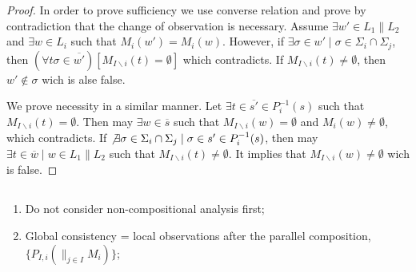 \documentclass[a4paper, 10pt, conference]{ieeeconf} \IEEEoverridecommandlockouts
\begin{document}
\begin{proof}
In order to prove sufficiency we use converse relation and prove by
contradiction that the change of observation is necessary.
Assume $\exists w' \in L_1 \parallel L_2$ and $\exists w \in L_i$ such that
$M_i(w')= M_i(w)$.
However, if $\exists \sigma \in w' \mid \sigma \in \Sigma_i \cap \Sigma_j$, then
$(\forall t\sigma \in \overline{w'}) \left[M_{I\backslash i}(t) =
\emptyset\right]$ which contradicts. 
If $M_{I\backslash i}(t) \neq \emptyset$, then $w' \not \in \sigma$ wich is
alse false.

We prove necessity in a similar manner.
Let $\exists t\in \overline{s'} \in P_i^{-1}(s)$ such that $M_{I\backslash i}(t)
= \emptyset$. Then may $\exists w \in \overline{s}$ such that $M_{I\backslash
i}(w) = \emptyset$ and $M_i(w) \neq \emptyset$, which contradicts. If $\not
\exists \sigma \in \Sigma_i \cap \Sigma_j \mid \sigma \in s' \in P_i^{-1}(s)$,
then may $\exists t \in \overline{w} \mid w \in L_1 \parallel L_2$ such that
$M_{I\backslash i}(t) \neq \emptyset$. It implies that $M_{I\backslash
i}(w) \neq \emptyset$ wich is false.

\end{proof}


\newpage

\subsection{}
\begin{enumerate}
  \item Do not consider non-compositional analysis first;
  \item Global consistency = local observations after the parallel
  composition, $\{ P_{I,i}(\parallel_{j \in I}M_i)\}$;
         
\end{enumerate}
\end{document}
